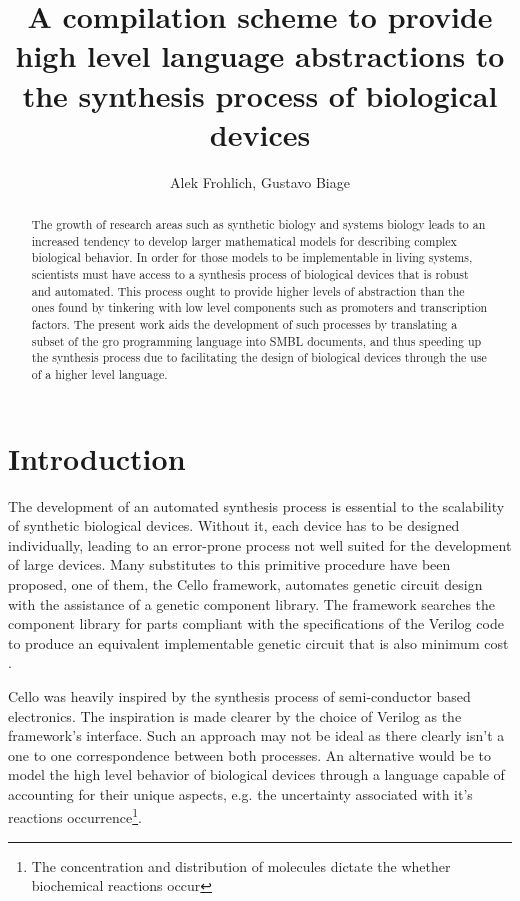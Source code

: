 \documentclass[12pt]{article}
\title{A compilation scheme to provide high level language abstractions to the synthesis process of biological devices}
\author{Alek Frohlich\inst{1}, Gustavo Biage\inst{1}}
\begin{document}
\maketitle
\begin{abstract}


    The growth of research areas such as synthetic biology and systems biology leads to an increased tendency to develop larger mathematical models for describing complex biological behavior. In order for those models to be implementable in living systems, scientists must have access to a synthesis process of biological devices that is robust and automated. This process ought to provide higher levels of abstraction than the ones found by tinkering with low level components such as promoters and transcription factors. The present work aids the development of such processes by translating a subset of the gro programming language into SMBL documents, and thus speeding up the synthesis process due to facilitating the design of biological devices through the use of a higher level language.


\end{abstract}
\section{Introduction}


    The development of an automated synthesis process is essential to the scalability of synthetic biological devices. Without it, each device has to be designed individually, leading to an error-prone process not well suited for the development of large devices. Many substitutes to this primitive procedure have been proposed, one of them, the Cello framework, automates genetic circuit design with the assistance of a genetic component library. The framework searches the component library for parts compliant with the specifications of the Verilog code to produce an equivalent implementable genetic circuit that is also minimum cost \cite{Nielsenaac7341}. 
    
    Cello was heavily inspired by the synthesis process of semi-conductor based electronics. The inspiration is made clearer by the choice of Verilog as the framework's interface. Such an approach may not be ideal as there clearly isn't a one to one correspondence between both processes. An alternative would be to model the high level behavior of biological devices through a language capable of accounting for their unique aspects, e.g. the uncertainty associated with it's reactions occurrence\footnote{The concentration and distribution of molecules dictate the whether biochemical reactions occur}.
    
\end{document}
